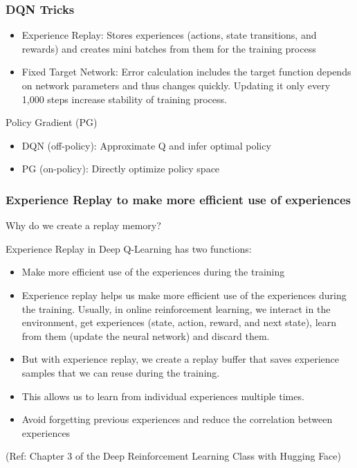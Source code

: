 \begin{frame}[fragile]\frametitle{DQN Tricks}

\begin{itemize}
\item Experience Replay: Stores experiences (actions, state transitions, and rewards) and creates mini batches from them for the training process
\item Fixed Target Network: Error calculation includes the target function depends on network parameters and thus changes quickly. Updating it only every 1,000 steps increase stability of training process.
\end{itemize}

Policy Gradient (PG)
\begin{itemize}
\item DQN (off-policy): Approximate Q and infer optimal policy
\item PG (on-policy): Directly optimize policy space
\end{itemize}

\end{frame}


\begin{frame}[fragile]\frametitle{Experience Replay to make more efficient use of experiences}

Why do we create a replay memory?

Experience Replay in Deep Q-Learning has two functions:


\begin{itemize}
\item Make more efficient use of the experiences during the training
\item Experience replay helps us make more efficient use of the experiences during the training. Usually, in online reinforcement learning, we interact in the environment, get experiences (state, action, reward, and next state), learn from them (update the neural network) and discard them.
\item But with experience replay, we create a replay buffer that saves experience samples that we can reuse during the training.
\item This allows us to learn from individual experiences multiple times.
\item Avoid forgetting previous experiences and reduce the correlation between experiences
\end{itemize}


{\tiny (Ref: Chapter 3 of the Deep Reinforcement Learning Class with Hugging Face)}

\end{frame}


